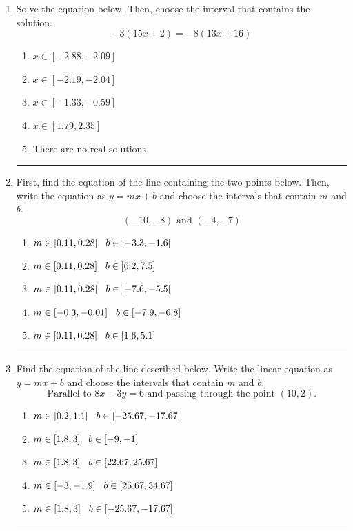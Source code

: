 \documentclass[14pt]{extbook}
\newcommand{\litem}[1]{\item#1\hspace*{-1cm}\rule{\textwidth}{0.4pt}}
\begin{document}
\begin{enumerate}
\litem{
Solve the equation below. Then, choose the interval that contains the solution.\[ -3(15x + 2) = -8(13x + 16) \]\begin{enumerate}[label=\Alph*.]
\item \( x \in [-2.88, -2.09] \)
\item \( x \in [-2.19, -2.04] \)
\item \( x \in [-1.33, -0.59] \)
\item \( x \in [1.79, 2.35] \)
\item \( \text{There are no real solutions.} \)

\end{enumerate} }
\litem{
First, find the equation of the line containing the two points below. Then, write the equation as $ y=mx+b $ and choose the intervals that contain $m$ and $b$.\[ (-10, -8) \text{ and } (-4, -7) \]\begin{enumerate}[label=\Alph*.]
\item \( m \in [0.11, 0.28] \hspace*{3mm} b \in [-3.3, -1.6] \)
\item \( m \in [0.11, 0.28] \hspace*{3mm} b \in [6.2, 7.5] \)
\item \( m \in [0.11, 0.28] \hspace*{3mm} b \in [-7.6, -5.5] \)
\item \( m \in [-0.3, -0.01] \hspace*{3mm} b \in [-7.9, -6.8] \)
\item \( m \in [0.11, 0.28] \hspace*{3mm} b \in [1.6, 5.1] \)

\end{enumerate} }
\litem{
Find the equation of the line described below. Write the linear equation as $ y=mx+b $ and choose the intervals that contain $m$ and $b$.\[ \text{Parallel to } 8 x - 3 y = 6 \text{ and passing through the point } (10, 2). \]\begin{enumerate}[label=\Alph*.]
\item \( m \in [0.2, 1.1] \hspace*{3mm} b \in [-25.67, -17.67] \)
\item \( m \in [1.8, 3] \hspace*{3mm} b \in [-9, -1] \)
\item \( m \in [1.8, 3] \hspace*{3mm} b \in [22.67, 25.67] \)
\item \( m \in [-3, -1.9] \hspace*{3mm} b \in [25.67, 34.67] \)
\item \( m \in [1.8, 3] \hspace*{3mm} b \in [-25.67, -17.67] \)


\end{enumerate}}
\end{enumerate}
\end{document}
